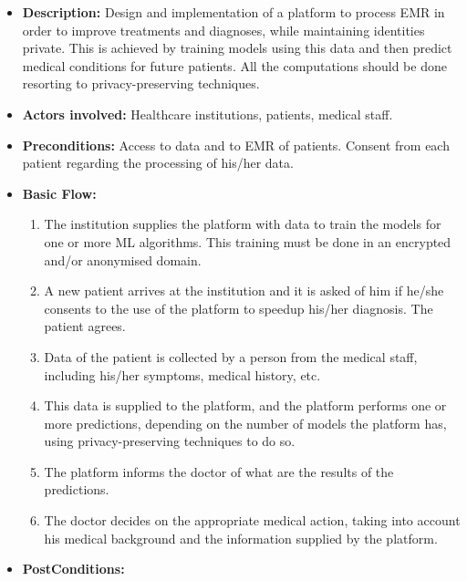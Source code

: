 \begin{itemize}
	\setlength\itemsep{1em}

	\item \textbf{Description:} Design and implementation of a platform to process \ac{EMR} in order to improve treatments and diagnoses, while maintaining identities private. This is achieved by training models using this data and then predict medical conditions for future patients. All the computations should be done resorting to privacy-preserving techniques.

	\item \textbf{Actors involved:} Healthcare institutions, patients, medical staff.

	\item \textbf{Preconditions:} Access to data and to \ac{EMR} of patients. Consent from each patient regarding the processing of his/her data.

	\item \textbf{Basic Flow:} 
	
	\begin{enumerate}
		\item The institution supplies the platform with data to train the models for one or more \ac{ML} algorithms. This training must be done in an encrypted and/or anonymised domain.

		\item A new patient arrives at the institution and it is asked of him if he/she consents to the use of the platform to speedup his/her diagnosis. The patient agrees.

		\item Data of the patient is collected by a person from the medical staff, including his/her symptoms, medical history, etc.

		\item This data is supplied to the platform, and the platform performs one or more predictions, depending on the number of models the platform has, using privacy-preserving techniques to do so.

		\item The platform informs the doctor of what are the results of the predictions.

		\item The doctor decides on the appropriate medical action, taking into account his medical background and the information supplied by the platform.


	\end{enumerate}

	\item \textbf{PostConditions:} 

\end{itemize}




